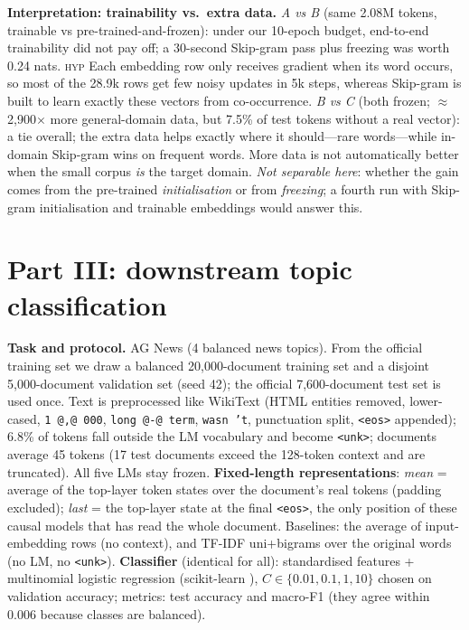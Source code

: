 \documentclass[10pt,a4paper]{article}
\newcommand{\hyp}{\textsc{hyp}}
\begin{document}
\textbf{Interpretation: trainability vs.\ extra data.} \emph{A vs B} (same 2.08M tokens, trainable vs
pre-trained-and-frozen): under our 10-epoch budget, end-to-end trainability did not pay off; a 30-second
Skip-gram pass plus freezing was worth 0.24 nats. \hyp{} Each embedding row only receives gradient when its
word occurs, so most of the 28.9k rows get few noisy updates in 5k steps, whereas Skip-gram is built to learn
exactly these vectors from co-occurrence. \emph{B vs C} (both frozen; $\approx$2,900$\times$ more general-domain
data, but 7.5\% of test tokens without a real vector): a tie overall; the extra data helps exactly where it
should---rare words---while in-domain Skip-gram wins on frequent words. More data is not automatically better
when the small corpus \emph{is} the target domain. \emph{Not separable here}: whether the gain comes from the
pre-trained \emph{initialisation} or from \emph{freezing}; a fourth run with Skip-gram initialisation and
trainable embeddings would answer this.

\section{Part III: downstream topic classification}
\textbf{Task and protocol.} AG News \citep{zhang2015} (4 balanced news topics). From the official training
set we draw a balanced 20,000-document training set and a disjoint 5,000-document validation set (seed 42);
the official 7,600-document test set is used once. Text is preprocessed like WikiText (HTML entities removed,
lower-cased, \texttt{1 @,@ 000}, \texttt{long @-@ term}, \texttt{wasn 't}, punctuation split, \texttt{<eos>}
appended); 6.8\% of tokens fall outside the LM vocabulary and become \texttt{<unk>}; documents average 45
tokens (17 test documents exceed the 128-token context and are truncated). All five LMs stay frozen.
\textbf{Fixed-length representations}: \emph{mean} = average of the top-layer token states over the
document's real tokens (padding excluded); \emph{last} = the top-layer state at the final \texttt{<eos>},
the only position of these causal models that has read the whole document. Baselines: the average of
input-embedding rows (no context), and TF-IDF uni+bigrams over the original words (no LM, no \texttt{<unk>}).
\textbf{Classifier} (identical for all): standardised features + multinomial logistic regression
(scikit-learn \citep{pedregosa2011}), $C\in\{0.01,0.1,1,10\}$ chosen on validation accuracy; metrics: test
accuracy and macro-F1 (they agree within 0.006 because classes are balanced).
\end{document}

